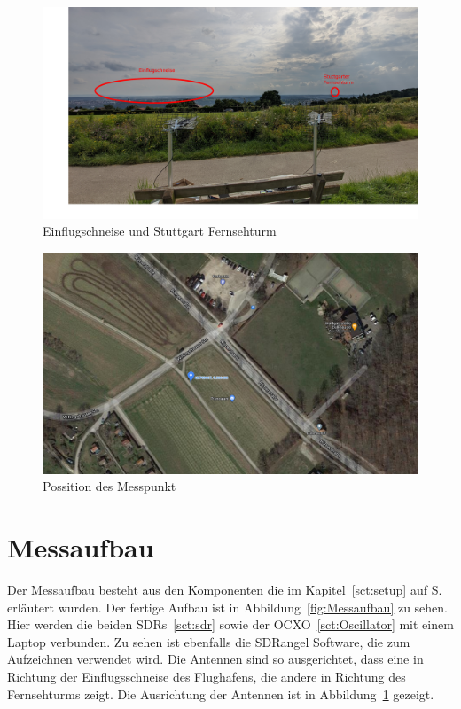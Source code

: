 \begin{figure}
    \centering
    \includegraphics[width=\textwidth]{images/Einflugschneise.jpg}
    \caption{Einflugschneise und Stuttgart Fernsehturm}\label{fig:Einflugschneise}
\end{figure}

\begin{figure}
    \centering
    \includegraphics[width=\textwidth]{images/Maps_Messpunkt.png}
    \caption{Possition des Messpunkt}\label{fig:Maps}
\end{figure}

\section{Messaufbau}
Der Messaufbau besteht aus den Komponenten die im Kapitel~\ref{sct:setup} auf S.\pageref{sct:setup} erläutert wurden. Der fertige Aufbau ist in Abbildung~\ref{fig:Messaufbau} zu sehen. Hier werden die beiden SDRs~\ref{sct:sdr} sowie der OCXO~\ref{sct:Oscillator} mit einem Laptop verbunden. Zu sehen ist ebenfalls die SDRangel Software, die zum Aufzeichnen verwendet wird. Die Antennen sind so ausgerichtet, dass eine in Richtung der Einflugsschneise des Flughafens, die andere in Richtung des Fernsehturms zeigt. Die Ausrichtung der Antennen ist in Abbildung~\ref{fig:Einflugschneise} gezeigt.

